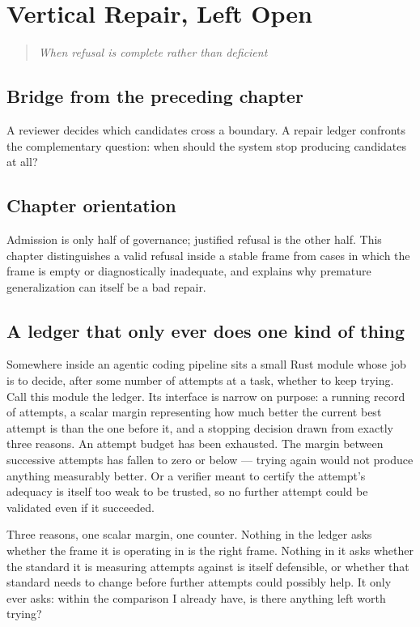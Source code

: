 \documentclass[11pt,openany]{book}
\newcommand{\chapterprecis}[1]{\begin{quote}\itshape #1\end{quote}}
\begin{document}
\chapter{Vertical Repair, Left Open}

\chapterprecis{When refusal is complete rather than deficient}

\section*{Bridge from the preceding chapter}

A reviewer decides which candidates cross a boundary. A repair ledger confronts the complementary question: when should the system stop producing candidates at all?

\section*{Chapter orientation}

Admission is only half of governance; justified refusal is the other half. This chapter distinguishes a valid refusal inside a stable frame from cases in which the frame is empty or diagnostically inadequate, and explains why premature generalization can itself be a bad repair.

\section{A ledger that only ever does one kind of thing}

Somewhere inside an agentic coding pipeline sits a small Rust module whose job is to decide, after some number of attempts at a task, whether to keep trying. Call this module the ledger. Its interface is narrow on purpose: a running record of attempts, a scalar margin representing how much better the current best attempt is than the one before it, and a stopping decision drawn from exactly three reasons. An attempt budget has been exhausted. The margin between successive attempts has fallen to zero or below — trying again would not produce anything measurably better. Or a verifier meant to certify the attempt's adequacy is itself too weak to be trusted, so no further attempt could be validated even if it succeeded.

Three reasons, one scalar margin, one counter. Nothing in the ledger asks whether the frame it is operating in is the right frame. Nothing in it asks whether the standard it is measuring attempts against is itself defensible, or whether that standard needs to change before further attempts could possibly help. It only ever asks: within the comparison I already have, is there anything left worth trying?
\end{document}
